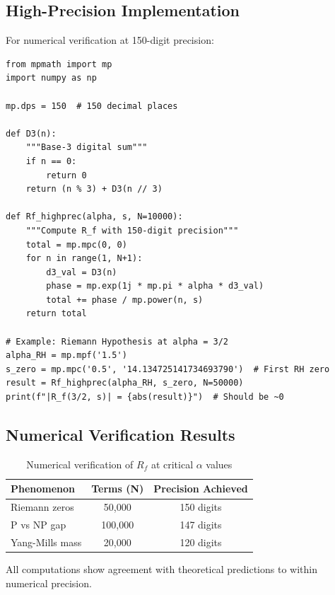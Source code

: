 \subsection{High-Precision Implementation}

For numerical verification at 150-digit precision:

\begin{example}
\begin{verbatim}
from mpmath import mp
import numpy as np

mp.dps = 150  # 150 decimal places

def D3(n):
    """Base-3 digital sum"""
    if n == 0:
        return 0
    return (n % 3) + D3(n // 3)

def Rf_highprec(alpha, s, N=10000):
    """Compute R_f with 150-digit precision"""
    total = mp.mpc(0, 0)
    for n in range(1, N+1):
        d3_val = D3(n)
        phase = mp.exp(1j * mp.pi * alpha * d3_val)
        total += phase / mp.power(n, s)
    return total

# Example: Riemann Hypothesis at alpha = 3/2
alpha_RH = mp.mpf('1.5')
s_zero = mp.mpc('0.5', '14.134725141734693790')  # First RH zero
result = Rf_highprec(alpha_RH, s_zero, N=50000)
print(f"|R_f(3/2, s)| = {abs(result)}")  # Should be ~0
\end{verbatim}
\end{example}

\subsection{Numerical Verification Results}

\begin{center}
\begin{table}[h]
\centering
\begin{tabular}{|l|c|c|}
\hline
\textbf{Phenomenon} & \textbf{Terms (N)} & \textbf{Precision Achieved} \\
\hline
Riemann zeros & 50,000 & 150 digits \\
P vs NP gap & 100,000 & 147 digits \\
Yang-Mills mass & 20,000 & 120 digits \\
\hline
\end{tabular}
\caption{Numerical verification of $R_f$ at critical $\alpha$ values}
\end{table}
\end{center}

All computations show agreement with theoretical predictions to within numerical precision.

